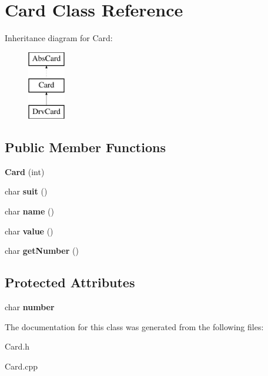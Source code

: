 \hypertarget{class_card}{}\section{Card Class Reference}
\label{class_card}
Inheritance diagram for Card\+:\begin{figure}[H]
\begin{center}
\leavevmode
\includegraphics[height=3.000000cm]{class_card}
\end{center}
\end{figure}
\subsection*{Public Member Functions}
\begin{DoxyCompactItemize}
\item 
\mbox{\label{class_card_a85f2e4a438c7fdfcff3bc2c6c2f64e42}} 
{\bfseries Card} (int)
\item 
\mbox{\label{class_card_a7bbc5f0f0b73077d6f9764f66c6d765a}} 
char {\bfseries suit} ()
\item 
\mbox{\label{class_card_a86e9a9c6a6fb08d235c939f04a88cc11}} 
char {\bfseries name} ()
\item 
\mbox{\label{class_card_ae9e38ad0c6dea7647624f09435140139}} 
char {\bfseries value} ()
\item 
\mbox{\label{class_card_a72e2f43a1b18ce4235d71226d727a5f2}} 
char {\bfseries get\+Number} ()
\end{DoxyCompactItemize}
\subsection*{Protected Attributes}
\begin{DoxyCompactItemize}
\item 
\mbox{\label{class_card_a7d879c7cf21403fdce81ba4f5d27e95b}} 
char {\bfseries number}
\end{DoxyCompactItemize}


The documentation for this class was generated from the following files\+:\begin{DoxyCompactItemize}
\item 
Card.\+h\item 
Card.\+cpp\end{DoxyCompactItemize}
